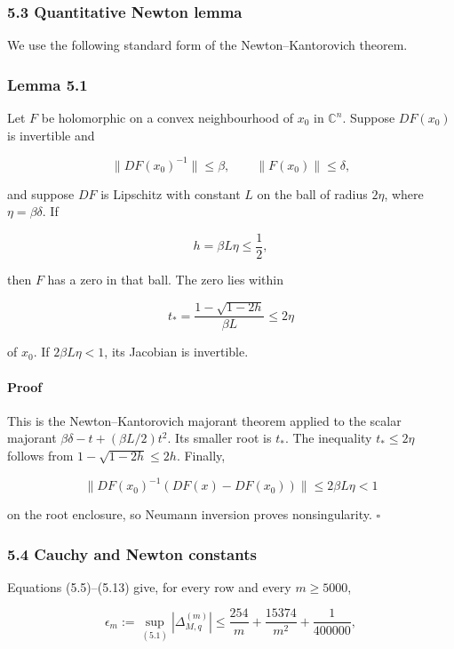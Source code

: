 \documentclass[
  11pt,
  a4paper,
]{article}
\begin{document}
\subsubsection{5.3 Quantitative Newton
lemma}\label{quantitative-newton-lemma}

We use the following standard form of the Newton--Kantorovich theorem.

\subsubsection{Lemma 5.1}\label{lemma-5.1}

Let \(F\) be holomorphic on a convex neighbourhood of \(x_0\) in
\(\mathbb C^n\). Suppose \(DF(x_0)\) is invertible and

\[
\|DF(x_0)^{-1}\|\le\beta,
\qquad
\|F(x_0)\|\le\delta,
\]

and suppose \(DF\) is Lipschitz with constant \(L\) on the ball of
radius \(2\eta\), where \(\eta=\beta\delta\). If

\[
h=\beta L\eta\le\frac12,
\]

then \(F\) has a zero in that ball. The zero lies within

\[
t_* = \frac{1-\sqrt{1-2h}}{\beta L}\le2\eta
\]

of \(x_0\). If \(2\beta L\eta<1\), its Jacobian is invertible.

\paragraph{Proof}\label{proof-1}

This is the Newton--Kantorovich majorant theorem applied to the scalar
majorant \(\beta\delta-t+(\beta L/2)t^2\). Its smaller root is \(t_*\).
The inequality \(t_*\le2\eta\) follows from \(1-\sqrt{1-2h}\le2h\).
Finally,

\[
\|DF(x_0)^{-1}(DF(x)-DF(x_0))\|
\le2\beta L\eta<1
\]

on the root enclosure, so Neumann inversion proves nonsingularity.
\(\square\)

\subsubsection{5.4 Cauchy and Newton
constants}\label{cauchy-and-newton-constants}

Equations (5.5)--(5.13) give, for every row and every \(m\ge5000\),

\[
\epsilon_m:=\sup_{(5.1)}|\Delta^{(m)}_{M,q}|
\le\frac{254}{m}+\frac{15374}{m^2}+\frac1{400000},
\tag{5.14}
\]
\end{document}
